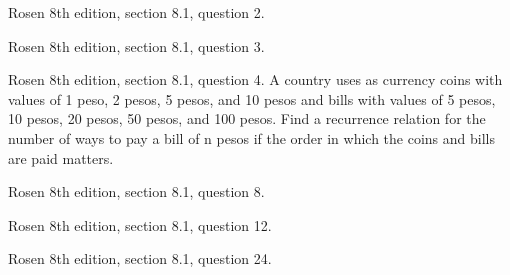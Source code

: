 \newpage
\nextq Rosen 8th edition, section 8.1, question 2.

\SOLUTION



\newpage
\nextq Rosen 8th edition, section 8.1, question 3.

\SOLUTION



\newpage
\nextq Rosen 8th edition, section 8.1, question 4.
A country uses as currency coins with values of 1 peso,
2 pesos, 5 pesos, and 10 pesos and bills with values of
5 pesos, 10 pesos, 20 pesos, 50 pesos, and 100 pesos.
Find a recurrence relation for the number of ways to pay
a bill of n pesos if the order in which the coins and bills
are paid matters.
\SOLUTION



\newpage
\nextq Rosen 8th edition, section 8.1, question 8.

\SOLUTION



\newpage
\nextq Rosen 8th edition, section 8.1, question 12.

\SOLUTION



\newpage
\nextq Rosen 8th edition, section 8.1, question 24.

\SOLUTION



\newpage


